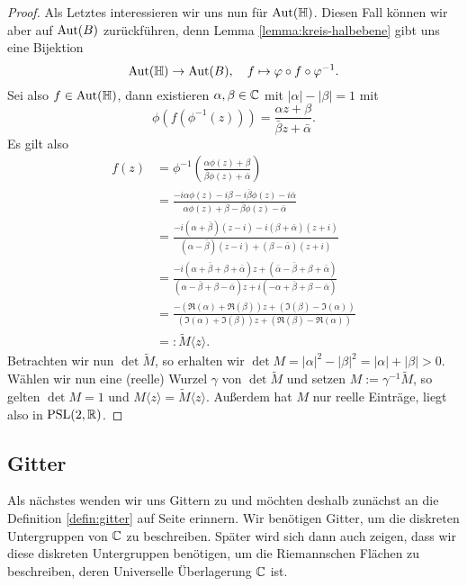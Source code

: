 \begin{proof}
  Als Letztes interessieren wir uns nun für $\operatorname{Aut}(\mathbb{H})$. Diesen Fall
  können wir aber auf $\operatorname{Aut}(B)$ zurückführen, denn Lemma
  \ref{lemma:kreis-halbebene} gibt uns eine Bijektion
  \[
  \operatorname{Aut}(\mathbb{H}) \rightarrow \operatorname{Aut}(B), \quad f \mapsto \varphi \circ f \circ \varphi^{-1}.
  \]
  Sei also $f \in \operatorname{Aut}(\mathbb{H})$, dann existieren $\alpha, \beta \in \mathbb{C}$
  mit $|\alpha| - |\beta| = 1$ mit
  \[
  \phi( f( \phi^{-1}(z))) = \frac{\alpha z + \beta}{\bar \beta z +
    \bar \alpha}.
  \]
  Es gilt also
  \begin{align*}
    f(z) & = \phi^{-1} \left ( \frac{\alpha \phi(z) + \beta}{\bar
        \beta \phi(z) + \bar \alpha} \right ) \\
    & = \frac{-i \alpha \phi(z) - i \beta - i \bar \beta \phi(z) - i
      \bar \alpha}{\alpha \phi(z) + \beta - \bar \beta \phi(z) - \bar
      \alpha} \\
    & = \frac{-i (\alpha + \bar \beta)(z-i) -i (\beta + \bar
      \alpha)(z+i)}{(\alpha - \bar \beta)(z -i) + (\beta - \bar
      \alpha)(z+i)} \\
    & = \frac{-i ( \alpha + \bar \beta + \beta + \bar \alpha) z + (
      \bar \alpha - \bar \beta + \beta + \bar \alpha)}{(\alpha - \bar
      \beta + \beta - \bar \alpha)z + i (- \alpha + \bar \beta + \beta
      - \bar \alpha)} \\
    & = \frac{ - ( \Re(\alpha) + \Re(\beta)) z +  (\Im(\beta) -
      \Im(\alpha))}{(\Im(\alpha) + \Im(\beta))z + ( \Re(\beta) -
      \Re(\alpha))} \\
    & =: \tilde M\langle z \rangle.
  \end{align*}
  Betrachten wir nun $\det \tilde M$, so erhalten wir $\det M = |\alpha|^2 -
  |\beta|^2 = |\alpha| + |\beta| > 0$. Wählen wir nun eine (reelle)
  Wurzel $\gamma$ von $\det \tilde M$ und setzen $M := \gamma^{-1}
  \tilde M$, so gelten $\det M = 1$ und $M \langle z \rangle = \tilde M
  \langle z \rangle$. Außerdem hat $M$ nur reelle Einträge, liegt also
  in $\operatorname{PSL}(2, \mathbb{R})$.
\end{proof}

\subsection{Gitter}
\label{sec:gitter}

Als nächstes wenden wir uns Gittern zu und möchten deshalb zunächst an
die Definition \ref{defin:gitter} auf Seite \pageref{defin:gitter}
erinnern. Wir benötigen Gitter, um die
diskreten Untergruppen von $\mathbb{C}$ zu beschreiben. Später wird sich dann
auch zeigen, dass wir diese diskreten Untergruppen benötigen, um die
Riemannschen Flächen zu beschreiben, deren Universelle Überlagerung
$\mathbb{C}$ ist.



